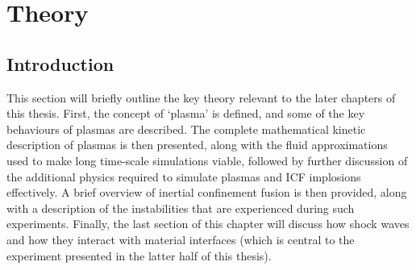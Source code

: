 

\chapter{Theory} \label{ch-theory}

\minitoc

\section{Introduction}
This section will briefly outline the key theory relevant to the later chapters of this thesis. First, the concept of `plasma' is defined, and some of the key behaviours of plasmas are described. The complete mathematical kinetic description of plasmas is then presented, along with the fluid approximations used to make long time-scale simulations viable, followed by further discussion of the additional physics required to simulate plasmas and ICF implosions effectively. A brief overview of inertial confinement fusion is then provided, along with a description of the instabilities that are experienced during such experiments. Finally, the last section of this chapter will discuss how shock waves and how they interact with material interfaces (which is central to the experiment presented in the latter half of this thesis).

